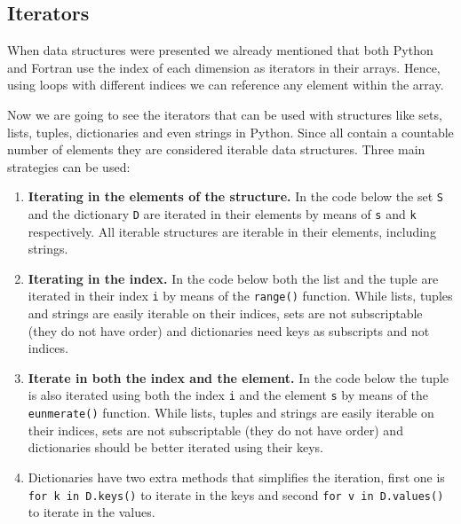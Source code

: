         
        
        \subsection*{Iterators}
        
        When data structures were presented we already mentioned that both Python and Fortran 
        use the index of each dimension as iterators in their arrays. 
        Hence, using loops with different indices we can reference any element within the array.
        
        Now we are going to see the iterators that can be used with structures like 
        sets, lists, tuples, dictionaries and even strings in Python.    
        Since all contain a countable number of elements they are considered iterable data structures. 
        Three main strategies can be used:
        \begin{enumerate}
            \item \textbf{Iterating in the elements of the structure.} 
            In the code below the set \texttt{S} and the dictionary \texttt{D} are iterated in their elements
            by means of \texttt{s} and \texttt{k} respectively. 
            All iterable structures are iterable in their elements, including strings.  
            \item \textbf{Iterating in the index.}
            In the code below both the list and the tuple are iterated in their index \texttt{i} by means of the \texttt{range()} function.
            While lists, tuples and strings are easily iterable on their indices, 
            sets are not subscriptable (they do not have order) and 
            dictionaries need keys as subscripts and not indices. 
            \item \textbf{Iterate in both the index and the element.} 
            In the code below the tuple is also iterated using both the index \texttt{i} and the element \texttt{s} 
            by means of the \texttt{eunmerate()} function.
            While lists, tuples and strings are easily iterable on their indices, 
            sets are not subscriptable (they do not have order) and 
            dictionaries should be better iterated using their keys.
            
            \item Dictionaries have two extra methods that simplifies the iteration, first one is 
            \texttt{for k in D.keys()} to iterate in the keys 
            and second \texttt{for v in D.values()} to iterate in the values. 
        \end{enumerate} 
        
